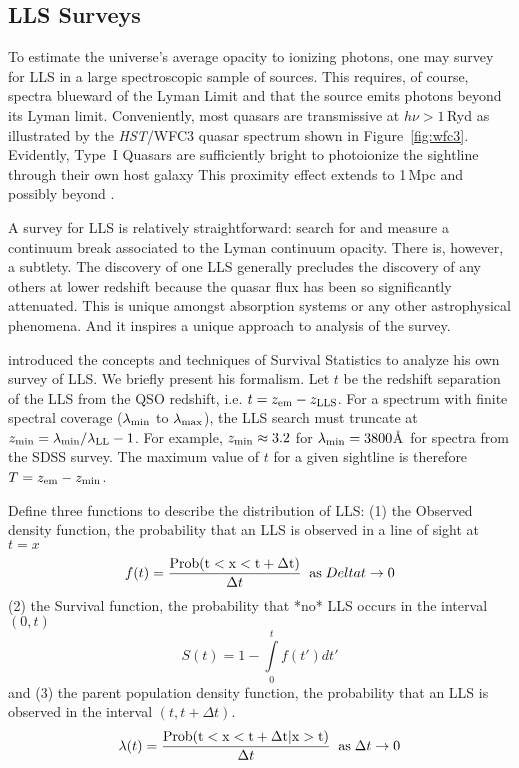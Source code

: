 \documentclass[graybox]{svmult}
\def\intl{\int\limits}
\begin{document}
\subsection{LLS Surveys}

To estimate the universe's average opacity to ionizing
photons, one may survey for LLS in a large spectroscopic
sample of sources.  This requires, of course, 
spectra blueward of the Lyman Limit and that the source
emits photons beyond its Lyman limit.
Conveniently, most quasars are transmissive at $h\nu > 1$\,Ryd
as illustrated by the {\it HST}/WFC3 quasar spectrum
shown in Figure~\ref{fig:wfc3}.
Evidently, Type~I Quasars are sufficiently bright to photoionize
the sightline through their own host galaxy
This proximity effect extends to 1\,Mpc and possibly
beyond \cite{qpq6}.

A survey for LLS is relatively straightforward:
search for and measure a continuum break associated to the
Lyman continuum opacity.  There is, however, a subtlety.
The discovery of one LLS generally precludes the discovery
of any others at lower redshift because the
quasar flux has been so significantly attenuated.
This is unique amongst absorption systems or any other
astrophysical phenomena.  And it inspires a unique approach
to analysis of the survey.

\cite{tytler82} introduced the concepts and techniques of 
Survival Statistics to analyze his own survey of LLS.  We
briefly present his formalism.
Let $t$ be the redshift separation of the LLS
from the QSO redshift, i.e. $t = z_{\rm em} - z_{\rm LLS}$.
For a spectrum with finite spectral coverage 
($\lambda_{\rm min}$ to $\lambda_{\rm max}$), 
the LLS search must truncate 
at $z_{\rm min} = \lambda_{\rm min}/\lambda_{\rm LL} - 1$.
For example, $z_{\rm min} \approx 3.2$ for $\lambda_{\rm min} = 3800$\AA\
for spectra from the SDSS survey.
The maximum value of $t$ for a given sightline
is therefore $T = z_{\rm em} - z_{\rm min}$.

Define three functions to describe the distribution of LLS:
(1)	the Observed density function, the probability that an LLS is observed
in a line of sight at $t=x$
\begin{equation}
f(t) = \frac{\rm Prob(t < x < t+\Delta t)}{\Delta t} \;\; 
\text{as} \; Delta t \to 0
\end{equation}
(2) the Survival function, the probability that *no* LLS occurs in the
interval $(0,t)$
\begin{equation}
S(t) = 1 - \intl_0^t f(t') dt'
\label{eqn:survive}
\end{equation}
and (3) the parent population density function, the probability that 
an LLS is observed in the interval $(t,t+\Delta t)$. 
\begin{equation}
\lambda(t) = \frac{\rm Prob(t < x < t+\Delta t|x>t)}{\Delta t} \;\; 
\text{as} \; \Delta t \to 0
\end{equation}
\end{document}
